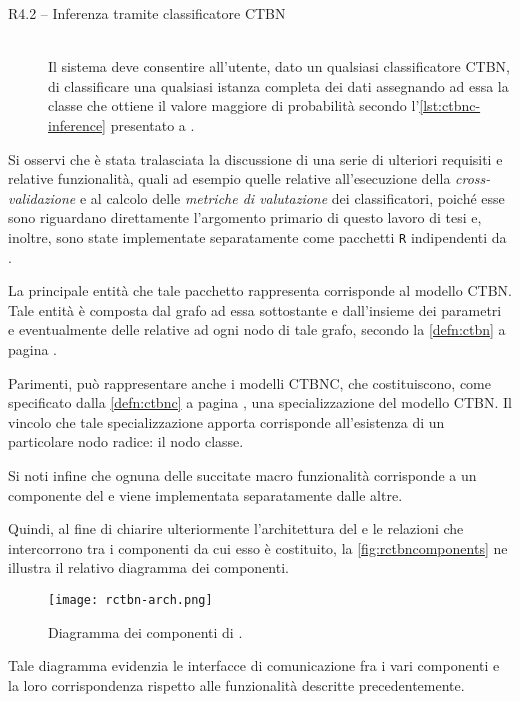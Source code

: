 \begin{description}
\begin{description}
		\item[R4.2 -- Inferenza tramite classificatore CTBN] \hfill \\
		Il sistema deve consentire all'utente, dato un qualsiasi classificatore \acs{CTBN}, di classificare una qualsiasi istanza completa dei dati assegnando ad essa la classe che ottiene il valore maggiore di probabilità secondo l'\autoref{lst:ctbnc-inference} presentato a .
		\end{description}
\end{description}
Si osservi che è stata tralasciata la discussione di una serie di ulteriori requisiti e relative funzionalità, quali ad esempio quelle relative all'esecuzione della \emph{cross-validazione} e al calcolo delle \emph{metriche di valutazione} dei classificatori, poiché esse sono riguardano direttamente l'argomento primario di questo lavoro di tesi e, inoltre, sono state implementate separatamente come pacchetti \lstinline$R$ indipendenti da \rctbn{}.

La principale entità che tale pacchetto rappresenta corrisponde al modello \acs{CTBN}. Tale entità è composta dal grafo ad essa sottostante e dall'insieme dei parametri e eventualmente delle \im{} relative ad ogni nodo di tale grafo, secondo la \autoref{defn:ctbn} a pagina \pageref{defn:ctbn}.

Parimenti, \rctbn{} può rappresentare anche i modelli \acs{CTBNC}, che costituiscono, come specificato dalla \autoref{defn:ctbnc} a pagina \pageref{defn:ctbnc}, una specializzazione del modello \acs{CTBN}. Il vincolo che tale specializzazione apporta corrisponde all'esistenza di un particolare nodo radice: il nodo classe.

Si noti infine che ognuna delle succitate macro funzionalità corrisponde a un componente del \pacchettor{} e viene implementata separatamente dalle altre.

Quindi, al fine di chiarire ulteriormente l'architettura del \pacchettor{} e le relazioni che intercorrono tra i componenti da cui esso è costituito, la \vref{fig:rctbncomponents} ne illustra il relativo diagramma dei componenti.
\begin{figure}[ht]
	\centering
	\texttt{[image: rctbn-arch.png]}
	\caption[Diagramma dei componenti di \rctbn{}]{Diagramma dei componenti di \rctbn{}.}
	\label{fig:rctbncomponents}
\end{figure}
Tale diagramma evidenzia le interfacce di comunicazione fra i vari componenti e la loro corrispondenza rispetto alle funzionalità descritte precedentemente.
